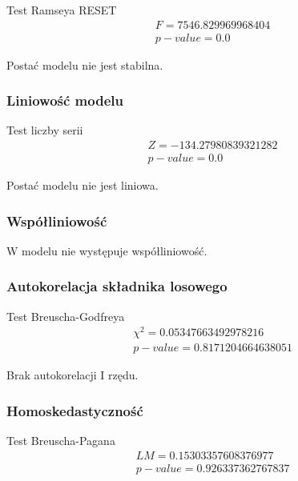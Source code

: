 Test Ramseya RESET
\begin{equation}
    \begin{split}
        &F = 7546.829969968404 \\ &p-value = 0.0
    \end{split}
\end{equation}

Postać modelu nie jest stabilna.

\subsubsection{Liniowość modelu}\label{liniowosc-modelu}
Test liczby serii
\begin{equation}
    \begin{split}
        &Z = -134.27980839321282 \\ &p-value = 0.0
    \end{split}
\end{equation}

Postać modelu nie jest liniowa.


\subsubsection{Współliniowość}\label{współliniowość}

W modelu nie występuje współliniowość.

\subsubsection{Autokorelacja składnika losowego}\label{autokorelacja-składnika-losowego}
Test Breuscha-Godfreya
\begin{equation}
    \begin{split}
        &\chi^{2}= 0.05347663492978216 \\ &p-value =0.8171204664638051
    \end{split}
\end{equation}

Brak autokorelacji I rzędu.

\subsubsection{Homoskedastyczność}
Test Breuscha-Pagana
\begin{equation}
    \begin{split}
        &LM=0.15303357608376977 \\  &p-value = 0.926337362767837
    \end{split}
\end{equation}

